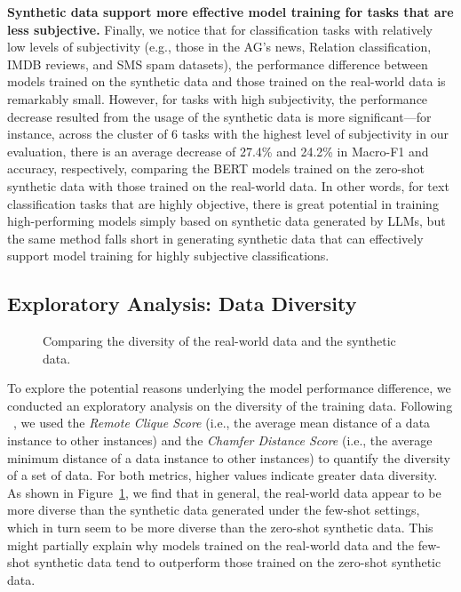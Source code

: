 \noindent \textbf{Synthetic data support more effective model training for tasks that are less subjective.} Finally, we notice that for classification tasks with relatively low levels of subjectivity (e.g., those in the AG's news, Relation classification, IMDB reviews, and SMS spam datasets), the performance difference between models trained on the synthetic data and those trained on the real-world data is remarkably small. 
However, for tasks with high subjectivity, the performance decrease resulted from the usage of the synthetic data is more significant---for instance, across the cluster of 6 tasks with the highest level of subjectivity in our evaluation, there is an average decrease of 27.4\% and 24.2\% in Macro-F1 and accuracy, respectively, comparing the BERT models trained on the zero-shot synthetic data with those trained on the real-world data. In other words, for text classification tasks that are highly objective, there is great potential in training high-performing models simply based on synthetic data generated by LLMs, but the same method falls short in generating synthetic data that can effectively support model training for highly subjective classifications. 

\subsection{Exploratory Analysis: Data Diversity}
\label{sec:exploratory}
\begin{figure}[t]
  \centering
  \hfill
  \caption{Comparing the diversity of the real-world data and the synthetic data.}
  \label{fig: diversity}
\end{figure}

To explore the potential reasons underlying the model performance difference, we conducted an exploratory analysis on the diversity of the training data. Following \citeauthor{10.1145/3411764.3445782}~, we used the {\em Remote Clique Score} (i.e., the average mean distance of a data instance to other instances) and the {\em Chamfer Distance Score} (i.e., the average minimum distance of a data instance to other instances) to quantify the diversity of a set of data. 
For both metrics, higher values indicate greater data diversity. 
As shown in Figure~\ref{fig: diversity}, we find that in general, the real-world data appear to be more diverse than the synthetic data generated under the few-shot settings, which in turn seem to be more diverse than the zero-shot synthetic data. This might partially explain why models trained on the real-world data and the few-shot synthetic data tend to outperform those trained on the zero-shot synthetic data. 

